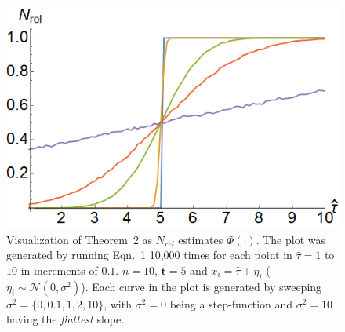 \documentclass[12pt]{article}
\def\td{\mathbf{t}}   %
\begin{document}
\newpage
\begin{figure}[!ht]
	\centering\includegraphics[width=0.7\columnwidth]{figures/thm2fig.png}
	\centering\caption{Visualization of Theorem~2 as $N_{rel}$ estimates $\Phi(\cdot)$. The plot was generated by running Eqn.~1 10,000 times for each point in $\hat{\tau} = 1$ to $10$ in increments of $0.1$. $n = 10$, $\td = 5$ and $x_i = \hat{\tau} + \eta_i$ ($\eta_i \sim\mathcal{N}(0, \sigma^2)$). Each curve in the plot is generated by sweeping $\sigma^2 = \{0, 0.1, 1, 2, 10\}$, with $\sigma^2 = 0$ being a step-function and $\sigma^2 = 10$ having the \emph{flattest} slope.}\label{fig:thm2fig}
\end{figure}
\end{document}
